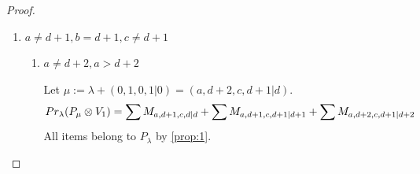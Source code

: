 \begin{proof}
\begin{enumerate}
\begin{enumerate}
      \item $Others$ $not(b<d,c>d+1)$ \par 
        Let $\mu:=\lambda + (1,0,0,1|0) = (d+2,b,c,d+1|d) $.
        \begin{equation}\notag
          \begin{aligned}
            Pr_{\lambda}(P_\mu \otimes V_{1}) &=
\sum M_{d+1,b,c,d|d}
+ \sum M_{d+1,b,c,d+1|d+1}
+ \sum M_{d+2,b,c,d+1|d+2}
          \end{aligned}
        \end{equation}
All items belong to $P_\lambda$ by \cref{prop:1}.
    \end{enumerate}

  \item $ a \neq d+1 ,b = d+1, c\neq d+1 $ 
    \begin{enumerate}
      \item $a \neq d+2, a > d+2 $ \par
        Let $\mu:=\lambda + (0,1,0,1|0) = (a,d+2,c,d+1|d) $.
        \begin{equation}\notag
          \begin{aligned}
            Pr_{\lambda}(P_\mu \otimes V_{1}) &=
\sum M_{a,d+1,c,d|d}
+ \sum M_{a,d+1,c,d+1|d+1}
+ \sum M_{a,d+2,c,d+1|d+2}
          \end{aligned}
        \end{equation}
All items belong to $P_\lambda$ by \cref{prop:1}.


\end{enumerate}
\end{enumerate}
\end{proof}
